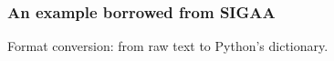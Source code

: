 \begin{frame}[fragile]
  \frametitle{An example borrowed from SIGAA}
  Format conversion: from raw text to Python's dictionary.
\end{frame}
